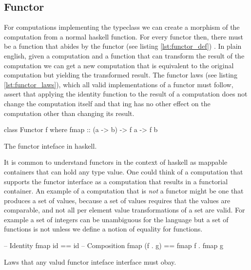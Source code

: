 \subsection{Functor}

For computations implementing the  typeclass we can
create a morphism of the computation from a normal haskell
function. For every functor  then, there must be a function
 that abides by the functor (see
listing \ref{lst:functor_def})
\cite{mcbrideApplicativeProgrammingEffects2008}. In plain english,
given a computation and a function that can transform the result of
the computation we can get a new computation that is equivalent to the
original computation but yielding the transformed result. The functor
laws (see listing \ref{lst:functor_laws}), which all valid
implementations of a functor must follow, assert that applying the
identity function to the result of a computation does not change the
computation itself and that  ing has no other effect on the
computation other than changing its result.
\begin{code}
\begin{haskellcode}
class Functor f where
  fmap :: (a -> b) -> f a -> f b
\end{haskellcode}
\caption{\label{lst:functor_def}The functor inteface in haskell.}
\end{code}

It is common to understand functors in the context of haskell as
mappable containers that can hold any type value. One could think of a
computation that supports the functor interface as a computation that
results in a functorial container. An example of a computation that is
\emph{not} a functor might be one that produces a set of values,
because a set of values requires that the values are comparable, and
not all per element value transformations of a set are valid. For
example a set of integers  can be unambiguous for the
language but a set of functions  is not
unless we define a notion of equality for functions.

\begin{code}
\begin{haskellcode}
-- Identity
fmap id == id
-- Composition
fmap (f . g) == fmap f . fmap g
\end{haskellcode}
\caption{\label{lst:functor_laws}Laws that any valud functor inteface interface must obay.}
\end{code}


